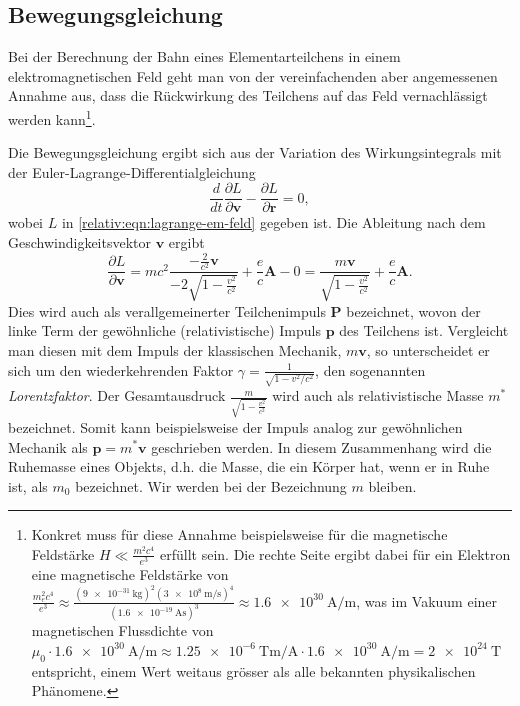 \subsection{Bewegungsgleichung
\label{relativ:section:bewegungsgleichung}}

Bei der Berechnung der Bahn eines Elementarteilchens
in einem elektromagnetischen Feld geht man von
der vereinfachenden aber angemessenen Annahme aus,
dass die Rückwirkung des Teilchens auf das Feld vernachlässigt werden kann\footnote{
Konkret muss für diese Annahme beispielsweise
für die magnetische Feldstärke
\(H \ll \frac{m^2c^4}{e^3}\) erfüllt sein.
Die rechte Seite ergibt dabei für ein Elektron
eine magnetische Feldstärke von
\(\frac{m_e^2c^4}{e^3} \approx
\frac{(\qty{9e-31}{\kilogram})^2 (\qty{3e8}{\metre\per\second})^4}{(\qty{1.6e-19}{\ampere\second})^3}
\approx \qty[per-mode=fraction]{1.6e30}{\ampere\per\metre}\),
was im Vakuum einer magnetischen Flussdichte von
\(\mu_0 \cdot \qty[per-mode=fraction]{1.6e30}{\ampere\per\metre} \approx
\qty[per-mode=fraction]{1.25e-6}{\tesla\metre\per\ampere} \cdot
\qty[per-mode=fraction]{1.6e30}{\ampere\per\metre} =
\qty{2e24}{\tesla}\)
entspricht, einem Wert weitaus grösser als alle bekannten physikalischen Phänomene.}.

Die Bewegungsgleichung ergibt sich aus der Variation des Wirkungsintegrals
mit der Euler-Lagrange-Differentialgleichung
\begin{equation}
    \frac{d}{dt} \frac{\partial L}{\partial \mathbf{v}} - \frac{\partial L}{\partial \mathbf{r}} = 0,
    \label{realtiv:eqn:euler-lagrange-em-feld}
\end{equation}
wobei \(L\) in \eqref{relativ:eqn:lagrange-em-feld} gegeben ist.
Die Ableitung nach dem Geschwindigkeitsvektor \(\mathbf{v}\) ergibt
\begin{equation}
    \frac{\partial L}{\partial \mathbf{v}} =
    mc^2 \frac{-\frac{2}{c^2}\mathbf{v}}{-2\sqrt{1-\frac{v^2}{c^2}}}
    + \frac{e}{c} \mathbf{A} - 0
    = \frac{m \mathbf{v}}{\sqrt{1-\frac{v^2}{c^2}}} + \frac{e}{c} \mathbf{A}.
    \label{realtiv:eqn:part-diff-v}
\end{equation}
Dies wird auch als verallgemeinerter Teilchenimpuls \(\mathbf{P}\) bezeichnet,
wovon der linke Term der gewöhnliche (relativistische) Impuls \(\mathbf{p}\)
des Teilchens ist.
Vergleicht man diesen mit dem Impuls der klassischen Mechanik, \(m\mathbf{v}\),
so unterscheidet er sich um den wiederkehrenden Faktor
\(\gamma=\frac{1}{\sqrt{1-v^2/c^2}}\), den sogenannten \emph{Lorentzfaktor}.
Der Gesamtausdruck \(\frac{m}{\sqrt{1-\frac{v^2}{c^2}}}\) wird auch als
relativistische Masse \(m^*\) bezeichnet. Somit kann beispielsweise der
Impuls analog zur gewöhnlichen Mechanik als
\(\mathbf{p}=m^*\mathbf{v}\) geschrieben werden.
In diesem Zusammenhang wird die Ruhemasse eines Objekts, d.h.
die Masse, die ein Körper hat, wenn er in Ruhe ist,
als \(m_0\) bezeichnet.
Wir werden bei der Bezeichnung \(m\) bleiben.

